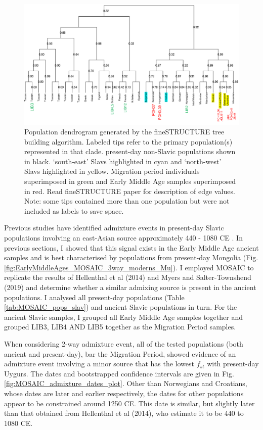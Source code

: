\begin{figure}[htp]
    \centering
    \includegraphics[width=1.0\textwidth]{../images/chapter5/tree_with_ancients.pdf}
    \caption{Population dendrogram generated by the fineSTRUCTURE tree building algorithm. Labeled tips refer to the primary population(s) represented in that clade. present-day non-Slavic populations shown in black. `south-east' Slavs highlighted in cyan and `north-west' Slavs highlighted in yellow. Migration period individuals superimposed in green and Early Middle Age samples superimposed in red. Read fineSTRUCTURE paper for description of edge values. Note: some tips contained more than one population but were not included as labels to save space.}
    \label{fig:tree_with_ancients}
\end{figure} 


Previous studies have identified admixture events in present-day Slavic populations involving an east-Asian source approximately 440 - 1080 CE \cite{Hellenthal2016, MOSAIC_2019}. In previous sections, I showed that this signal exists in the Early Middle Age ancient samples and is best characterised by populations from present-day Mongolia (Fig. \ref{fig:EarlyMiddleAges_MOSAIC_3way_moderns_Mu}). I employed MOSAIC \cite{MOSAIC_2019} to replicate the results of Hellenthal et al (2014) and Myers and Salter-Townshend (2019) and determine whether a similar admixing source is present in the ancient populations. I analysed all present-day populations (Table \ref{tab:MOSAIC_pops_slav}) and ancient Slavic populations in turn. For the ancient Slavic samples, I grouped all Early Middle Age samples together and grouped LIB3, LIB4 AND LIB5 together as the Migration Period samples. 

When considering 2-way admixture event, all of the tested populations (both ancient and present-day), bar the Migration Period, showed evidence of an admixture event involving a minor source that has the lowest $f_{st}$ with present-day Uygurs. The dates and bootstrapped confidence intervals are given in Fig. \ref{fig:MOSAIC_admixture_dates_plot}. Other than Norwegians and Croatians, whose dates are later and earlier respectively, the dates for other populations appear to be constrained around 1250 CE. This date is similar, but slightly later than that obtained from Hellenthal et al (2014), who estimate it to be 440 to 1080 CE.

